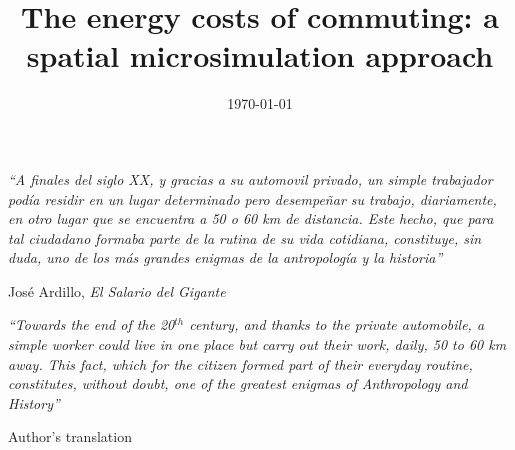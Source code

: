 \documentclass[a4paper, 11pt, twoside]{Thesis}
\begin{document}
\frontmatter	  

\title  {The energy costs of commuting: a spatial microsimulation approach}
\addresses  {\groupname\\\deptname\\\univname}  
\date       {\today}
\subject    {}
\keywords   {}

\maketitle


\fancyhead{}  
\fancyhead[LE,RO]{\thepage}
\fancyfoot{}
\lhead{}  

\pagestyle{fancy}  

\clearpage  

\pagestyle{empty}  

\null\vfill
\textit{``A finales del siglo XX, y gracias a su automovil privado, un simple
trabajador pod\'{i}a residir en un lugar determinado pero desempe\~nar su trabajo,
diariamente, en otro lugar que se encuentra a 50 o 60 km de distancia. Este
hecho, que para tal ciudadano formaba parte de la rutina de su vida
cotidiana, constituye, sin duda, uno de los m\'{a}s grandes enigmas de la
antropolog\'{i}a y la historia''}

\begin{flushright}
Jos\'{e} Ardillo, \emph{El Salario del Gigante}
\end{flushright}

\textit{``Towards the end of the 20$^{th}$ century, and thanks to the private
automobile, a simple worker could live in one place but carry out their work,
daily, 50 to
60 km away. This fact, which for the citizen formed part of their everyday
routine, constitutes, without doubt, one of the greatest enigmas of Anthropology
and History''}

\begin{flushright}
Author's translation
\end{flushright}



\vfill\vfill\vfill\vfill\vfill\vfill\null
\clearpage  
\end{document}
